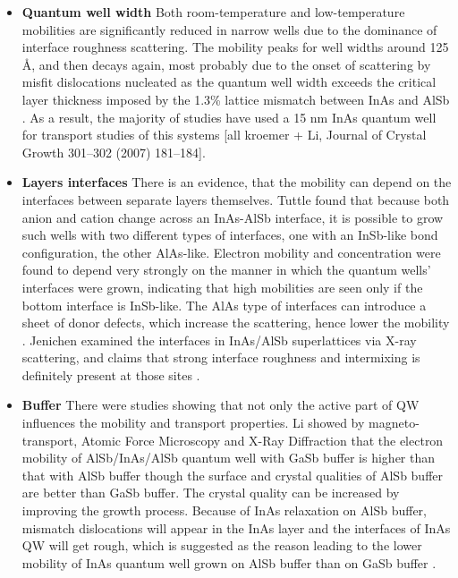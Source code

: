 \documentclass[titlepage,a4paper]{book}
\begin{document}
\begin{itemize}
\item \textbf{Quantum well width} \newline  
Both room-temperature and low-temperature mobilities are significantly reduced in narrow wells due to the dominance of interface roughness scattering. The mobility peaks for well widths around 125 Å, and then decays again, most probably due to the onset of scattering by misfit dislocations nucleated as the quantum well width exceeds the critical layer thickness imposed by the 1.3\% lattice mismatch between InAs and AlSb \cite{Bolognesi_Width}. As a result, the majority of studies have used a 15 nm InAs quantum well for transport studies of this systems [all kroemer + Li, Journal of Crystal Growth 301–302 (2007) 181–184].

\item \textbf{Layers interfaces} \newline
There is an evidence, that the mobility can depend on the interfaces between separate layers themselves. Tuttle found that because both anion and cation change across an InAs-AlSb interface, it is possible to grow such wells with two different types of interfaces, one with an InSb-like bond configuration, the other AlAs-like. Electron mobility and concentration were found to depend very strongly on the manner in which the quantum wells' interfaces were grown, indicating that high mobilities are seen only if the bottom interface is InSb-like. The AlAs type of interfaces can introduce a sheet of donor defects, which increase the scattering, hence lower the mobility \cite{Tuttle_Interface}. Jenichen examined the interfaces in InAs\slash AlSb superlattices via X-ray scattering, and claims that strong interface roughness and intermixing is definitely present at those sites \cite{Jenichen_Interfaces}.

\item \textbf{Buffer} \newline
There were studies showing that not only the active part of QW influences the mobility and transport properties. Li showed by magneto-transport, Atomic Force Microscopy and X-Ray Diffraction that the electron mobility of AlSb/InAs/AlSb quantum well with GaSb buffer is higher than that with AlSb buffer though the surface and crystal qualities of AlSb buffer are better than GaSb buffer. The crystal quality can be increased by improving the growth process. Because of InAs relaxation on AlSb buffer, mismatch dislocations will appear in the InAs layer and the interfaces of InAs QW will get rough, which is suggested as the reason leading to the lower mobility of InAs quantum well grown on AlSb buffer than on GaSb buffer \cite{Li_Buffer}. 


\end{itemize}
\end{document}
